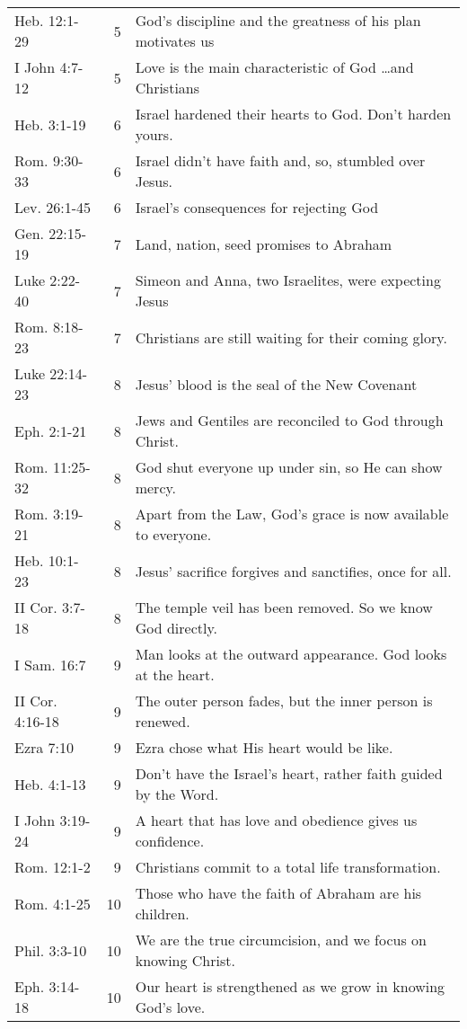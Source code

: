 \begin{table}[h]
\begin{tabular}{lrp{11cm}}
Heb. 12:1-29    & 5  & God's discipline and the greatness of his plan motivates us\\
I John 4:7-12   & 5  & Love is the main characteristic of God \ldots and Christians\\
Heb. 3:1-19     & 6  & Israel hardened their hearts to God.  Don't harden yours.\\
Rom. 9:30-33    & 6  & Israel didn't have faith and, so, stumbled over Jesus.\\
Lev. 26:1-45    & 6  & Israel's consequences for rejecting God\\
Gen. 22:15-19   & 7  & Land, nation, seed promises to Abraham\\
Luke 2:22-40    & 7  & Simeon and Anna, two Israelites, were expecting Jesus\\
Rom. 8:18-23    & 7  & Christians are still waiting for their coming glory.\\
Luke 22:14-23   & 8  & Jesus' blood is the seal of the New Covenant\\
Eph. 2:1-21     & 8  & Jews and Gentiles are reconciled to God through Christ.\\
Rom. 11:25-32   & 8  & God shut everyone up under sin, so He can show mercy.\\
Rom. 3:19-21    & 8  & Apart from the Law, God's grace is now available to everyone.\\
Heb. 10:1-23    & 8  & Jesus' sacrifice forgives and sanctifies, once for all.\\
II Cor. 3:7-18  & 8  & The temple veil has been removed.  So we know God directly.\\
I Sam. 16:7     & 9  & Man looks at the outward appearance.  God looks at the heart.\\
II Cor. 4:16-18 & 9  & The outer person fades, but the inner person is renewed.\\
Ezra 7:10       & 9  & Ezra chose what His heart would be like.\\
Heb. 4:1-13     & 9  & Don't have the Israel's heart, rather faith guided by the Word.\\
I John 3:19-24  & 9  & A heart that has love and obedience gives us confidence.\\
Rom. 12:1-2     & 9  & Christians commit to a total life transformation.\\
Rom. 4:1-25     & 10 & Those who have the faith of Abraham are his children.\\
Phil. 3:3-10    & 10 & We are the true circumcision, and we focus on knowing Christ.\\Eph. 3:14-18    & 10 & Our heart is strengthened as we grow in knowing God's love.\\

\end{tabular}
\end{table}
